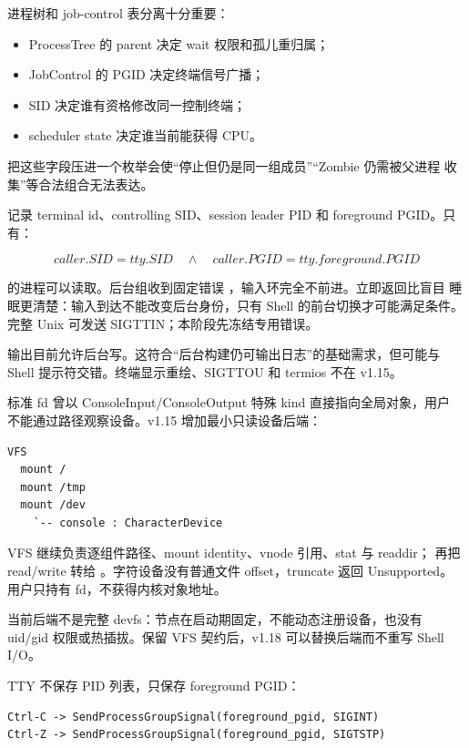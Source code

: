 进程树和 job-control 表分离十分重要：

\begin{itemize}
  \item ProcessTree 的 parent 决定 wait 权限和孤儿重归属；
  \item JobControl 的 PGID 决定终端信号广播；
  \item SID 决定谁有资格修改同一控制终端；
  \item scheduler state 决定谁当前能获得 CPU。
\end{itemize}

把这些字段压进一个枚举会使“停止但仍是同一组成员”“Zombie 仍需被父进程
收集”等合法组合无法表达。

 记录 terminal id、controlling SID、session leader PID 和
foreground PGID。只有：

\[
caller.SID=tty.SID\quad\land\quad caller.PGID=tty.foreground.PGID
\]

的进程可以读取。后台组收到固定错误
，输入环完全不前进。立即返回比盲目
睡眠更清楚：输入到达不能改变后台身份，只有 Shell 的前台切换才可能满足条件。
完整 Unix 可发送 SIGTTIN；本阶段先冻结专用错误。

输出目前允许后台写。这符合“后台构建仍可输出日志”的基础需求，但可能与 Shell
提示符交错。终端显示重绘、SIGTTOU 和 termios  不在 v1.15。

标准 fd 曾以 ConsoleInput/ConsoleOutput 特殊 kind 直接指向全局对象，用户
不能通过路径观察设备。v1.15 增加最小只读设备后端：

\begin{lstlisting}
VFS
  mount /
  mount /tmp
  mount /dev
    `-- console : CharacterDevice
\end{lstlisting}

VFS 继续负责逐组件路径、mount identity、vnode 引用、stat 与 readdir；
 再把 read/write 转给
。字符设备没有普通文件 offset，truncate 返回 Unsupported。
用户只持有 fd，不获得内核对象地址。

当前后端不是完整 devfs：节点在启动期固定，不能动态注册设备，也没有 uid/gid
权限或热插拔。保留 VFS 契约后，v1.18 可以替换后端而不重写 Shell I/O。

TTY 不保存 PID 列表，只保存 foreground PGID：

\begin{lstlisting}
Ctrl-C -> SendProcessGroupSignal(foreground_pgid, SIGINT)
Ctrl-Z -> SendProcessGroupSignal(foreground_pgid, SIGTSTP)
\end{lstlisting}

